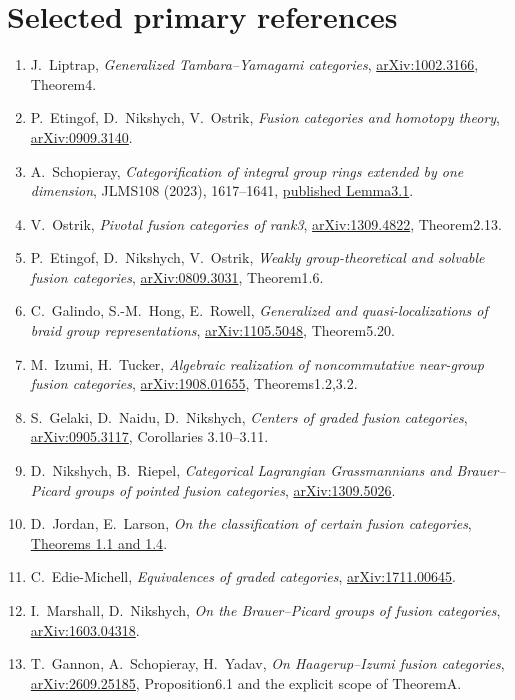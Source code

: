 \documentclass[11pt]{article}
\begin{document}
\section*{Selected primary references}
\begin{enumerate}
\item J.~Liptrap, \emph{Generalized Tambara--Yamagami categories},
\href{https://arxiv.org/abs/1002.3166}{arXiv:1002.3166}, Theorem4.
\item P.~Etingof, D.~Nikshych, V.~Ostrik, \emph{Fusion categories and
homotopy theory}, \href{https://arxiv.org/abs/0909.3140}{arXiv:0909.3140}.
\item A.~Schopieray, \emph{Categorification of integral group rings extended
by one dimension}, JLMS108 (2023), 1617--1641,
\href{https://doi.org/10.1112/jlms.12789}{published Lemma3.1}.
\item V.~Ostrik, \emph{Pivotal fusion categories of rank3},
\href{https://arxiv.org/abs/1309.4822}{arXiv:1309.4822}, Theorem2.13.
\item P.~Etingof, D.~Nikshych, V.~Ostrik, \emph{Weakly group-theoretical
and solvable fusion categories},
\href{https://arxiv.org/abs/0809.3031}{arXiv:0809.3031}, Theorem1.6.
\item C.~Galindo, S.-M.~Hong, E.~Rowell, \emph{Generalized and
quasi-localizations of braid group representations},
\href{https://arxiv.org/abs/1105.5048}{arXiv:1105.5048}, Theorem5.20.
\item M.~Izumi, H.~Tucker, \emph{Algebraic realization of noncommutative
near-group fusion categories},
\href{https://arxiv.org/abs/1908.01655}{arXiv:1908.01655}, Theorems1.2,3.2.
\item S.~Gelaki, D.~Naidu, D.~Nikshych, \emph{Centers of graded fusion
categories}, \href{https://arxiv.org/abs/0905.3117}{arXiv:0905.3117},
Corollaries 3.10--3.11.
\item D.~Nikshych, B.~Riepel, \emph{Categorical Lagrangian Grassmannians
and Brauer--Picard groups of pointed fusion categories},
\href{https://arxiv.org/abs/1309.5026}{arXiv:1309.5026}.
\item D.~Jordan, E.~Larson, \emph{On the classification of certain fusion
categories}, \href{https://ems.press/content/serial-article-files/30464}{Theorems 1.1 and 1.4}.
\item C.~Edie-Michell, \emph{Equivalences of graded categories},
\href{https://arxiv.org/abs/1711.00645}{arXiv:1711.00645}.
\item I.~Marshall, D.~Nikshych, \emph{On the Brauer--Picard groups of
fusion categories}, \href{https://arxiv.org/abs/1603.04318}{arXiv:1603.04318}.
\item T.~Gannon, A.~Schopieray, H.~Yadav, \emph{On Haagerup--Izumi fusion
categories}, \href{https://arxiv.org/abs/2609.25185}{arXiv:2609.25185},
Proposition6.1 and the explicit scope of TheoremA.
\end{enumerate}
\end{document}
